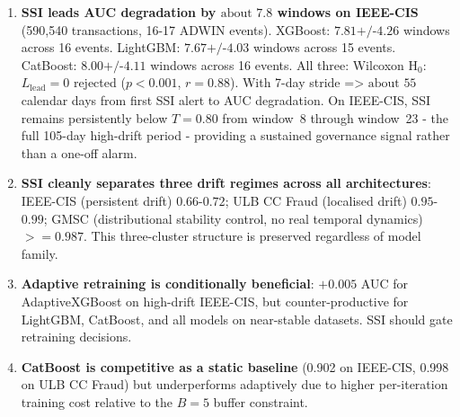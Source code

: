 \documentclass[pdflatex,sn-mathphys-num]{sn-jnl}
\theoremstyle{thmstyleone}
\theoremstyle{thmstyletwo}
\theoremstyle{thmstylethree}
\begin{document}
\begin{enumerate}
  \item \textbf{SSI leads AUC degradation by ${\text{about }}7.8$ windows on
        IEEE-CIS} (590,540 transactions, 16-17 ADWIN events).
        XGBoost: $7.81 \text{+/-} 4.26$ windows across 16 events.
        LightGBM: $7.67 \text{+/-} 4.03$ windows across 15 events.
        CatBoost: $8.00 \text{+/-} 4.11$ windows across 16 events.
        All three: Wilcoxon H$_0$: $L_{\mathrm{lead}}=0$ rejected ($p{<}0.001$,
        $r=0.88$). With 7-day stride $\text{=>}$ ${\text{about }}55$ calendar
        days from first SSI alert to AUC degradation. On IEEE-CIS, SSI
        remains persistently below $T=0.80$ from window~8 through
        window~23 - the full 105-day high-drift period - providing a
        sustained governance signal rather than a one-off alarm.

  \item \textbf{SSI cleanly separates three drift regimes across all
        architectures}: IEEE-CIS (persistent drift) $0.66$-$0.72$;
        ULB CC Fraud (localised drift) $0.95$-$0.99$; GMSC (distributional
        stability control, no real temporal dynamics) ${\mathrel{>=}}0.987$.
        This three-cluster structure is preserved regardless of model family.

  \item \textbf{Adaptive retraining is conditionally beneficial}: $+0.005$
        AUC for AdaptiveXGBoost on high-drift IEEE-CIS, but
        counter-productive for LightGBM, CatBoost, and all models on
        near-stable datasets. SSI should gate retraining decisions.

  \item \textbf{CatBoost is competitive as a static baseline} (0.902 on
        IEEE-CIS, 0.998 on ULB CC Fraud) but underperforms adaptively
        due to higher per-iteration training cost relative to the $B=5$
        buffer constraint.
\end{enumerate}
\end{document}
